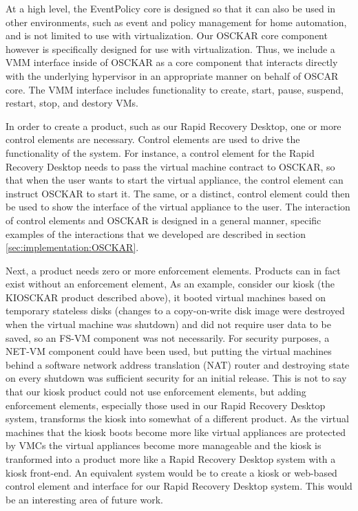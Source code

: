 At a high level, the EventPolicy core is designed so that it can also be used in other environments, such as event and policy management for home automation, and is not limited to use with virtualization. Our OSCKAR core component however is specifically designed for use with virtualization. Thus, we include a VMM interface inside of OSCKAR as a core component that interacts directly with the underlying hypervisor in an appropriate manner on behalf of OSCAR core. The VMM interface includes functionality to create, start, pause, suspend, restart, stop, and destory VMs.

In order to create a product, such as our Rapid Recovery Desktop, one or more control elements are necessary. Control elements are used to drive the functionality of the system. For instance, a control element for the Rapid Recovery Desktop needs to pass the virtual machine contract to OSCKAR, so that when the user wants to start the virtual appliance, the control element can instruct OSCKAR to start it. The same, or a distinct, control element could then be used to show the interface of the virtual appliance to the user. The interaction of control elements and OSCKAR is designed in a general manner, specific examples of the interactions that we developed are described in section \ref{sec:implementation:OSCKAR}.

Next, a product needs zero or more enforcement elements. Products can in fact exist without an enforcement element, As an example, consider our kiosk (the KIOSCKAR product described above), it booted virtual machines based on temporary stateless disks (changes to a copy-on-write disk image were destroyed when the virtual machine was shutdown) and did not require user data to be saved, so an FS-VM component was not necessarily. For security purposes, a NET-VM component could have been used, but putting the virtual machines behind a software network address translation (NAT) router and destroying state on every shutdown was sufficient security for an initial release. This is not to say that our kiosk product could not use enforcement elements, but adding enforcement elements, especially those used in our Rapid Recovery Desktop system, transforms the kiosk into somewhat of a different product. As the virtual machines that the kiosk boots become more like virtual appliances are protected by VMCs the virtual appliances become more manageable and the kiosk is tranformed into a product more like a Rapid Recovery Desktop system with a kiosk front-end. An equivalent system would be to create a kiosk or web-based control element and interface for our Rapid Recovery Desktop system. This would be an interesting area of future work. 

